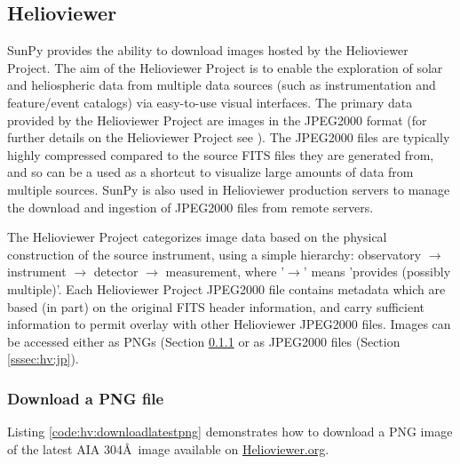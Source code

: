 \subsection{Helioviewer}\label{ssec:hv}

SunPy provides the ability to download images hosted by the
Helioviewer Project.  The aim of the Helioviewer Project is to enable
the exploration of solar and heliospheric data from multiple data
sources (such as instrumentation and feature/event catalogs) via
easy-to-use visual interfaces.  The primary data provided by the
Helioviewer Project are images in the JPEG2000 format (for further
details on the Helioviewer Project see \cite{muller2009}). The
JPEG2000 files are typically highly compressed compared to the source
FITS files they are generated from, and so can be a used as a shortcut
to visualize large amounts of data from multiple sources.  SunPy is
also used in Helioviewer production servers to manage the download and
ingestion of JPEG2000 files from remote servers.

The Helioviewer Project categorizes image data based on the physical
construction of the source instrument, using a simple hierarchy:
observatory $\rightarrow$ instrument $\rightarrow$ detector
$\rightarrow$ measurement, where '$\rightarrow$' means 'provides
(possibly multiple)'.  Each Helioviewer Project JPEG2000 file contains
metadata which are based (in part) on the original FITS header
information, and carry sufficient information to permit overlay with
other Helioviewer JPEG2000 files. Images can be accessed either as
PNGs (Section \ref{sssec:hv:png} or as JPEG2000 files (Section
\ref{sssec:hv:jp}).

\subsubsection{Download a PNG file}\label{sssec:hv:png}

Listing \ref{code:hv:downloadlatestpng} demonstrates how to download a
PNG image of the latest AIA 304\AA\ image available on
\url{Helioviewer.org}.

